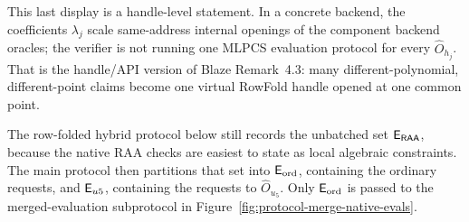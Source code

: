 This last display is a handle-level statement.  In a concrete backend, the
coefficients \(\lambda_j\) scale same-address internal openings of the
component backend oracles; the verifier is not running one MLPCS evaluation
protocol for every \(\widehat O_{h_j}\).  That is the handle/API version of
Blaze Remark~4.3: many different-polynomial, different-point claims become one
virtual RowFold handle opened at one common point.

The row-folded hybrid protocol below still records the unbatched set
\(\mathsf{E}_{\mathsf{RAA}}\), because the native RAA checks are easiest to state as
local algebraic constraints.  The main protocol then partitions that set into
\(\mathsf{E}_{\mathrm{ord}}\), containing the ordinary requests, and
\(\mathsf{E}_{u5}\), containing the requests to \(\widehat O_{u_5}\).  Only
\(\mathsf{E}_{\mathrm{ord}}\) is passed to the merged-evaluation subprotocol in
Figure~\ref{fig:protocol-merge-native-evals}.

